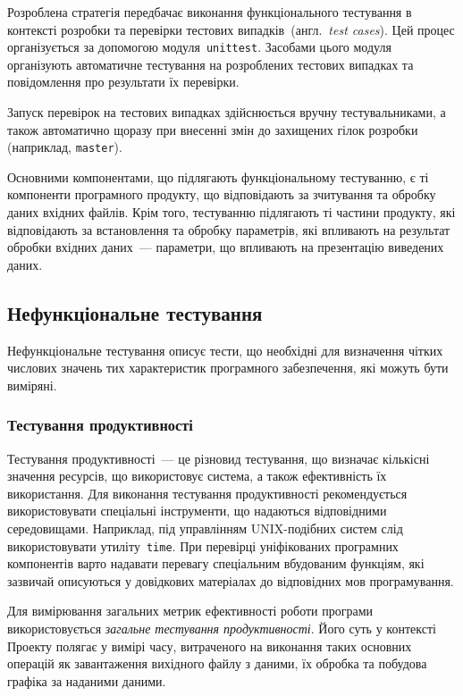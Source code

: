 \documentclass[a4paper,oneside,DIV=12,12pt]{scrartcl}
\newcommand{\cmdtoolname}[1]{\texttt{#1}}
\newcommand{\module}[1]{\texttt{#1}}
\newcommand{\langdef}[2]{{#1}.~\textit{#2}}
\newcommand{\branch}[1]{\texttt{#1}}
\begin{document}
			Розроблена стратегія передбачає виконання функціонального тестування в контексті розробки та перевірки тестових випадків~(\langdef{англ}{test cases}). Цей процес організується за допомогою модуля~\module{unittest}. Засобами цього модуля організують автоматичне тестування на розроблених тестових випадках та повідомлення про результати їх перевірки.
			
			Запуск перевірок на тестових випадках здійснюється вручну тестувальниками, а також автоматично щоразу при внесенні змін до захищених гілок розробки (наприклад, \branch{master}).
			
			Основними компонентами, що підлягають функціональному тестуванню, є ті компоненти програмного продукту, що відповідають за зчитування та обробку даних вхідних файлів. Крім того, тестуванню підлягають ті частини продукту, які відповідають за встановлення та обробку параметрів, які впливають на результат обробки вхідних даних~— параметри, що впливають на презентацію виведених даних.
			
		\subsection{Нефункціональне тестування}
			Нефункціональне тестування описує тести, що необхідні для визначення чітких числових значень тих характеристик програмного забезпечення, які можуть бути виміряні. 
			
			\subsubsection{Тестування продуктивності}
				Тестування продуктивності~— це різновид тестування, що визначає кількісні значення ресурсів, що використовує система, а також ефективність їх використання. Для виконання тестування продуктивності рекомендується використовувати спеціальні інструменти, що надаються відповідними середовищами. Наприклад, під управлінням UNIX-подібних систем слід використовувати утиліту~\cmdtoolname{time}. При перевірці уніфікованих програмних компонентів варто надавати перевагу спеціальним вбудованим функціям, які зазвичай описуються у довідкових матеріалах до відповідних мов програмування.
				
				Для вимірювання загальних метрик ефективності роботи програми використовується \emph{загальне тестування продуктивності}. Його суть у контексті Проекту полягає у вимірі часу, витраченого на виконання таких основних операцій як завантаження вихідного файлу з даними, їх обробка та побудова графіка за наданими даними.
				
\end{document}
